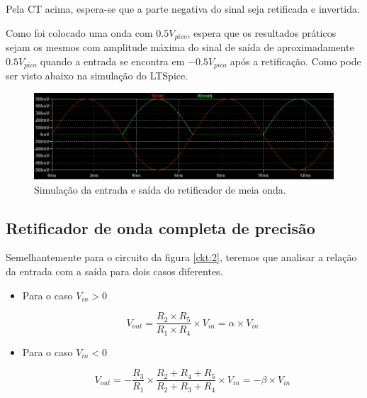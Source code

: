Pela CT acima, espera-se que a parte negativa do sinal seja retificada e invertida.

Como foi colocado uma onda com $0.5V_{pico}$, espera que os resultados práticos sejam os mesmos com amplitude máxima do sinal de saída de aproximadamente $0.5V_{pico}$ quando a entrada se encontra em $-0.5V_{pico}$ após a retificação. Como pode ser visto abaixo na simulação do LTSpice.

\begin{figure}[H] 
\centering
\includegraphics[scale=0.6]{images/vo_1.jpg}
\caption{Simulação da entrada e saída do retificador de meia onda.}
\label{fig1} 
\end{figure}

\subsection{Retificador de onda completa de precisão}

Semelhantemente para o circuito da figura \ref{ckt:2}, teremos que analisar a relação da entrada com a saída para dois casos diferentes.

\begin{itemize}
    \item Para o caso $V_{in}>0$ \\
    \begin{center}
        \begin{equation} \label{vsat+}
            V_{out} = \frac{R_2 \times R_5 }{R_1 \times R_4} \times V_{in} = \alpha \times V_{in}
        \end{equation}
    \end{center}
    
    \item Para o caso $V_{in}<0$ \\
    
    \begin{center}
        \begin{equation} \label{vsat+}
            V_{out} = -\frac{R_3}{R_1} \times \frac{R_2 + R_4 + R_5}{R_2 + R_3 + R_4} \times V_{in} = -\beta \times V_{in}
        \end{equation}
    \end{center}
\end{itemize}

